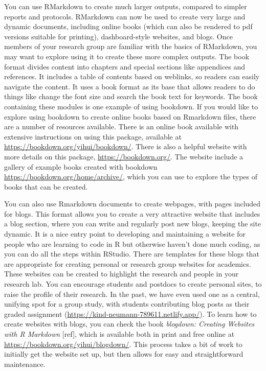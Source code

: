 \documentclass[]{tufte-book}
\begin{document}
You can use RMarkdown to create much larger outputs, compared to simpler reports
and protocols. RMarkdown can now be used to create very large and dynamic
documents, including online books (which can also be rendered to pdf versions
suitable for printing), dashboard-style websites, and blogs. Once members of
your research group are familiar with the basics of RMarkdown, you may want to
explore using it to create these more complex outputs. The book format divides
content into chapters and special sections like appendices and references. It
includes a table of contents based on weblinks, so readers can easily navigate
the content. It uses a book format as its base that allows readers to do things
like change the font size and search the book text for keywords. The book
containing these modules is one example of using bookdown. If you would like to
explore using bookdown to create online books based on Rmarkdown files, there
are a number of resources available. There is an online book available with
extensive instructions on using this package, available at
\url{https://bookdown.org/yihui/bookdown/}. There is also a helpful website with more
details on this package, \url{https://bookdown.org/}. The website include a gallery of
example books created with bookdown \url{https://bookdown.org/home/archive/}, which
you can use to explore the types of books that can be created.

You can also use Rmarkdown documents to create webpages, with pages included for
blogs. This format allows you to create a very attractive website that includes
a blog section, where you can write and regularly post new blogs, keeping the
site dynamic. It is a nice entry point to developing and maintaining a website
for people who are learning to code in R but otherwise haven't done much coding,
as you can do all the steps within RStudio. There are templates for these blogs
that are appropriate for creating personal or research group websites for
academics. These websites can be created to highlight the research and people in
your research lab. You can encourage students and postdocs to create personal
sites, to raise the profile of their research. In the past, we have even used
one as a central, unifying spot for a group study, with students contributing
blog posts as their graded assignment
(\url{https://kind-neumann-789611.netlify.app/}). To learn how to create websites with
blogs, you can check the book \emph{blogdown: Creating Websites with R Markdown}
{[}ref{]}, which is available both in print and free online at
\url{https://bookdown.org/yihui/blogdown/}. This process takes a bit of work to
initially get the website set up, but then allows for easy and straightforward
maintenance.
\end{document}
